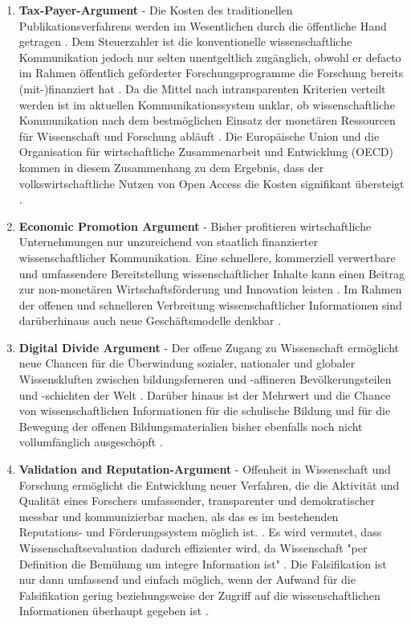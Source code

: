 \begin{enumerate}
\item \textbf{Tax-Payer-Argument} - Die Kosten des traditionellen Publikationsverfahrens werden im Wesentlichen durch die öffentliche Hand getragen \cite{muller_2010_open}. Dem Steuerzahler ist die konventionelle wissenschaftliche Kommunikation jedoch nur selten unentgeltlich zugänglich, obwohl er defacto im Rahmen öffentlich geförderter Forschungsprogramme die Forschung bereits (mit-)finanziert hat \cite{suber_2003_taxpayer} \cite{Beverungen_2012} \cite{Adema_2014_open_access}. Da die Mittel nach intransparenten Kriterien verteilt werden ist im aktuellen Kommunikationssystem unklar, ob wissenschaftliche Kommunikation nach dem bestmöglichen Einsatz der monetären Ressourcen für Wissenschaft und Forschung abläuft \cite{Glasziou_2014} \cite{altman_1994_scandal}. Die Europäische Union und die Organisation für wirtschaftliche Zusammenarbeit und Entwicklung (OECD) kommen in diesem Zusammenhang zu dem Ergebnis, dass der volkswirtschaftliche Nutzen von Open Access die Kosten signifikant übersteigt \cite{WD_bundestag_2009}.
\item \textbf{Economic Promotion Argument} - Bisher profitieren wirtschaftliche Unternehmungen nur unzureichend von staatlich finanzierter wissenschaftlicher Kommunikation. Eine schnellere, kommerziell verwertbare und umfassendere Bereitstellung wissenschaftlicher Inhalte kann einen Beitrag zur non-monetären Wirtschaftsförderung und Innovation leisten \cite{heise_2012} \cite{suchen OECD EU}. Im Rahmen der offenen und schnelleren Verbreitung wissenschaftlicher Informationen sind darüberhinaus auch neue Geschäftsmodelle denkbar \cite{suchen}.
\item \textbf{Digital Divide Argument} - Der offene Zugang zu Wissenschaft ermöglicht neue Chancen für die Überwindung sozialer, nationaler und globaler Wissenskluften \cite{suchen} zwischen bildungsferneren und -affineren Bevölkerungsteilen und -schichten der Welt \cite{boai_2012}. Darüber hinaus ist der Mehrwert und die Chance von wissenschaftlichen Informationen für die schulische Bildung und für die Bewegung der offenen Bildungsmaterialien bisher ebenfalls noch nicht vollumfänglich ausgeschöpft \cite{heise_lernen_2013}.
\item \textbf{Validation and Reputation-Argument} - Offenheit in Wissenschaft und Forschung ermöglicht die Entwicklung neuer Verfahren, die die Aktivität und Qualität eines Forschers umfassender, transparenter und demokratischer messbar und kommunizierbar machen, als das es im bestehenden Reputations- und Förderungssystem möglich ist. \cite{chalmers_2009_avoidable_waste}. Es wird vermutet, dass Wissenschaftsevaluation dadurch effizienter wird, da Wissenschaft "per Definition die Bemühung um integre Information ist" \cite{umstatter_2007_qualitatssicherung}. Die Falsifikation ist nur dann umfassend und einfach möglich, wenn der Aufwand für die Falsifikation gering beziehungsweise der Zugriff auf die wissenschaftlichen Informationen überhaupt gegeben ist \cite{umstatter_2007_qualitatssicherung}.

\end{enumerate}
